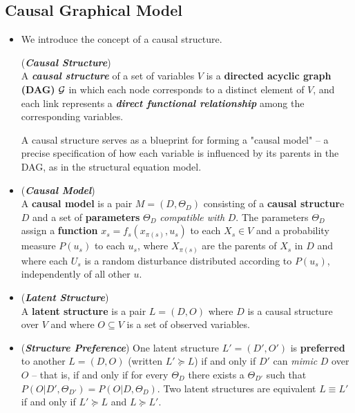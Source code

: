 \documentclass[11pt]{article}
\begin{document}
\subsection{Causal Graphical Model}
\begin{itemize}
\item We introduce the concept of a causal structure. 
\begin{definition} (\textbf{\emph{Causal Structure}}) \citep{pearl2000causal}\\
A \emph{\textbf{causal structure}} of a set of variables $V$ is a \textbf{directed acyclic graph (DAG)} ${\mathcal G}$ in which each node corresponds to a distinct element of $V$, and each link represents a \emph{\textbf{direct functional relationship}} among the corresponding variables.
\end{definition} 

A causal structure serves as a blueprint for forming a "causal model" – a precise specification of how each variable is influenced by its parents in the DAG, as in the structural equation model.

\item \begin{definition} (\textbf{\emph{Causal Model}}) \citep{pearl2000causal}\\
A \textbf{causal model} is a pair $M=(D, \Theta_{D})$ consisting of a \textbf{causal structur}e $D$ and a set of \textbf{parameters} $\Theta_{D}$ \emph{compatible with} $D$. The parameters $\Theta_{D}$ assign a \textbf{function} $x_s = f_s(x_{\pi(s)}, u_s)$ to each $X_s \in V$ and a probability measure $P(u_{s})$ to each $u_{s}$, where $X_{\pi(s)}$ are the parents of $X_s$ in $D$ and where each $U_{s}$ is a random disturbance distributed according to $P(u_{s})$, independently of all other $u$.
\end{definition} 

\item \begin{definition} (\textbf{\emph{Latent Structure}}) \citep{pearl2000causal}\\
A \textbf{latent structure} is a pair $L = (D, O)$ where $D$ is a causal structure over $V$ and where $O \subseteq V$ is a set of observed variables.
\end{definition}  

\item  \begin{definition} (\textbf{\emph{Structure Preference}})
One latent structure $L' = (D', O')$ is \textbf{preferred} to another $L = (D, O)$ (written $L'  \succeq L$) if and only if $D'$ can \emph{mimic} $D$ over $O$ – that is, if and only if for every $\Theta_{D}$ there exists a $\Theta_{D'}$ such that $P(O | D', \Theta_{D'}) = P(O | D, \Theta_{D})$. Two latent structures are equivalent $L \equiv L'$ if and only if $L' \succeq L$ and $L \succeq L'$.
\end{definition}  


\end{itemize}
\end{document}
